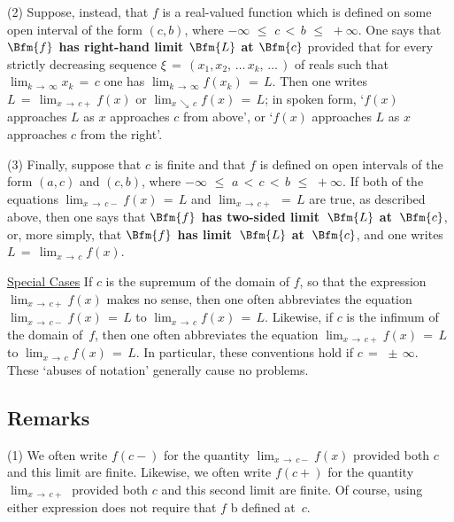 \V

        (2) Suppose, instead, that $f$ is a real-valued function which is defined on some open interval of the form $(c,b)$, where $-{\infty}\,\,{\leq}\,\,c\,<\,b\,\,{\leq}\,\,+{\infty}$.
    One says that {\bf $\Bfm{f}$ has right-hand limit $\Bfm{L}$ at $\Bfm{c}$} provided that for every strictly decreasing sequence
    ${\xi} \,=\, (x_{1}, x_{2},\,{\ldots}\,x_{k},\,{\ldots}\,)$ of reals such that $\lim_{k \,{\rightarrow}\, {\infty}} x_{k} \,=\, c$
    one has $\lim_{k \,{\rightarrow}\, {\infty}} f(x_{k}) \,=\, L$. Then one writes $L \,=\, \lim_{x \,{\rightarrow}\, c+} f(x)$
    or $\lim_{x \,{\searrow}\, c} f(x) \,=\, L$; in spoken form, `$f(x)$ approaches $L$ as $x$ approaches $c$ from above',
    or `$f(x)$ approaches $L$ as $x$ approaches $c$ from the right'.

\V

    (3) Finally, suppose that $c$ is finite and that $f$ is defined on open intervals of the form $(a,c)$ and $(c,b)$, where $-{\infty}\,\,{\leq}\,\,a\,<\,c\,<\,b\,\,{\leq}\,\,+{\infty}$.
    If both of the equations $\lim_{x  \,{\rightarrow}\, c-} f(x) \,=\, L$ and $\lim_{x \,{\rightarrow}\, c+} \,=\, L$ are true, as described above,
    then one says that {\bf $\Bfm{f}$ has two-sided limit~$\Bfm{L}$ at~$\Bfm{c}$}, or, more simply,
    that {\bf $\Bfm{f}$ has limit~$\Bfm{L}$ at~$\Bfm{c}$}, and one writes $L \,=\, \lim_{x \,{\rightarrow}\, c} f(x)$.

\V


        \underline{Special Cases} If $c$ is the supremum of the domain of $f$, so that the expression $\lim_{x \,{\rightarrow}\, c+} f(x)$ makes no sense,
    then one often abbreviates the equation $\lim_{x \,{\rightarrow}\, c-} f(x) \,=\, L$ to $\lim_{x \,{\rightarrow}\, c} f(x) \,=\, L$.
    Likewise, if $c$ is the infimum of the domain of~$f$, then one often abbreviates the equation
    $\lim_{x \,{\rightarrow}\, c+} f(x) \,=\, L$ to $\lim_{x \,{\rightarrow}\, c} f(x) \,=\, L$.
    In particular, these conventions hold if $c \,=\, \,{\pm}\, {\infty}$. These `abuses of notation' generally cause no problems.

\VV

            \subsection{\small{\bf Remarks}}
            \label{RemrkD50.20}

\V

\hspace*{\parindent}(1) We often write $f(c-)$ for the quantity $\lim_{x \,{\rightarrow}\, c-} f(x)$ provided both $c$ and this limit are finite.
    Likewise, we often write $f(c+)$ for the quantity $\lim_{x \,{\rightarrow}\, c+}$ provided both $c$ and this second limit are finite.
    Of course, using either expression does not require that $f$ b defined at~$c$.

